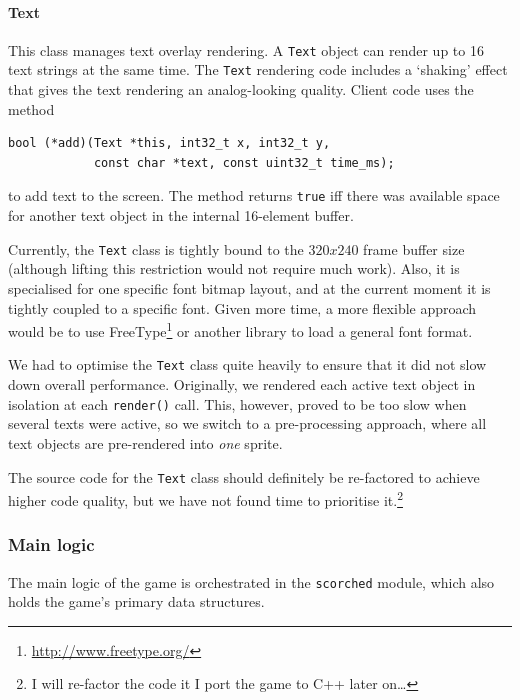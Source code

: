 \documentclass[a4paper,10pt]{article}
\newcommand{\isrc}[1]{\texttt{#1}}
\begin{document}
\paragraph{Text} This class manages text overlay rendering. A \isrc{Text}
object can render up to 16 text strings at the same time.  The \isrc{Text}
rendering code includes a `shaking' effect that gives the text rendering an
analog-looking quality.  Client code uses the method
\begin{lstlisting}
bool (*add)(Text *this, int32_t x, int32_t y,
            const char *text, const uint32_t time_ms);
\end{lstlisting}
to add text to the screen. The method returns \isrc{true} iff there was
available space for another text object in the internal 16-element buffer.

Currently, the \isrc{Text} class is tightly bound to the $320x240$ frame
buffer size (although lifting this restriction would not require much work).
Also, it is specialised for one specific font bitmap layout, and at the
current moment it is tightly coupled to a specific font. Given more time, a
more flexible approach would be to use
FreeType\footnote{\url{http://www.freetype.org/}} or another library to load a
general font format.

We had to optimise the \isrc{Text} class quite heavily to ensure that it did
not slow down overall performance. Originally, we rendered each active text
object in isolation at each \isrc{render()} call. This, however, proved to be
too slow when several texts were active, so we switch to a pre-processing
approach, where all text objects are pre-rendered into \emph{one} sprite.

The source code for the \isrc{Text} class should definitely be re-factored to
achieve higher code quality, but we have not found time to prioritise
it.\footnote{I will re-factor the code it I port the game to C++ later
on\ldots}

\subsubsection{Main logic}
The main logic of the game is orchestrated in the \isrc{scorched} module,
which also holds the game's primary data structures.
\end{document}
